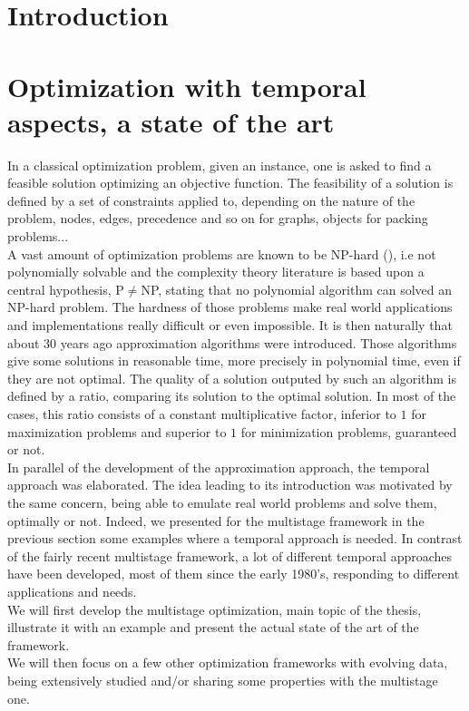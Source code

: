 \documentclass[a4paper]{book}
\newcommand{\chapterToc}[1]{\chapter*{\numberline{} #1} \addcontentsline{toc}{chapter}{#1} \markboth{#1}{}}
\begin{document}
    \vspace{1.5cm}











\tableofcontents



\chapterToc{Introduction}
\chapter{Optimization with temporal aspects, a state of the art}



In a classical optimization problem, given an instance, one is asked to find a feasible solution optimizing an objective function. The feasibility of a solution is defined by a set of constraints applied to, depending on the nature of the problem, nodes, edges, precedence and so on for graphs, objects for packing problems...\\ A vast amount of optimization problems are known to be NP-hard (\cite{gj}), i.e not polynomially solvable and the complexity theory literature is based upon a central hypothesis, P$\ne$NP, stating that no polynomial algorithm can solved an NP-hard problem. The hardness of those problems make real world applications and implementations really difficult or even impossible. It is then naturally that about 30 years ago approximation algorithms were introduced. Those algorithms give some solutions in reasonable time, more precisely in polynomial time, even if they are not optimal. The quality of a solution outputed by such an algorithm is defined by a ratio, comparing its solution to the optimal solution. In most of the cases, this ratio consists of a constant multiplicative factor, inferior to $1$ for maximization problems and superior to $1$ for minimization problems, guaranteed or not. \\
In parallel of the development of the approximation approach, the temporal approach was elaborated. The idea leading to its introduction was motivated by the same concern, being able to emulate real world problems and solve them, optimally or not. Indeed, we presented for the multistage framework in the previous section some examples where a temporal approach is needed. In contrast of the fairly recent multistage framework, a lot of different temporal approaches have been developed, most of them since the early 1980's, responding to different applications and needs. \\
We will first develop the multistage optimization, main topic of the thesis, illustrate it with an example and present the actual state of the art of the framework. \\
We will then focus on a few other optimization frameworks with evolving data, being extensively studied and/or sharing some properties with the multistage one. \\
\end{document}
